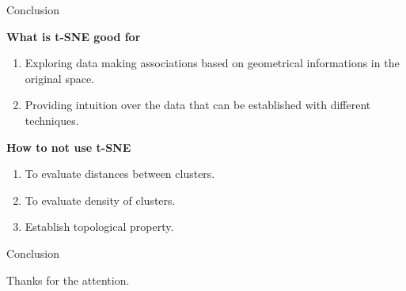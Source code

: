 \documentclass[10pt]{beamer}
\theoremstyle{definition}
\newcommand{\1}{\mathbbm{1}}
\begin{document}
\begin{frame}{Conclusion}
  \begin{minipage}{0.45\textwidth}
    \begin{center}
      {\bf What is t-SNE good for}
    \end{center}
    \begin{enumerate}
      \item Exploring data making associations based on geometrical
        informations in the original space.
      \item Providing intuition over the data that can be established  with different
        techniques.
    \end{enumerate}
  \end{minipage}
  \hfill
  \begin{minipage}[h!]{0.45\textwidth}
    \begin{center}
      {\bf How to not use t-SNE}
    \end{center}
    \vspace{.8cm}
    \begin{enumerate}
      \item To evaluate distances between clusters.
      \item To evaluate density of clusters.
      \item Establish topological property.
    \end{enumerate}
  \end{minipage}
\end{frame}
\begin{frame}{Conclusion}{}
    \begin{center}
       \Large
      Thanks for the attention.
    \end{center}
  \end{frame}
\end{document}
